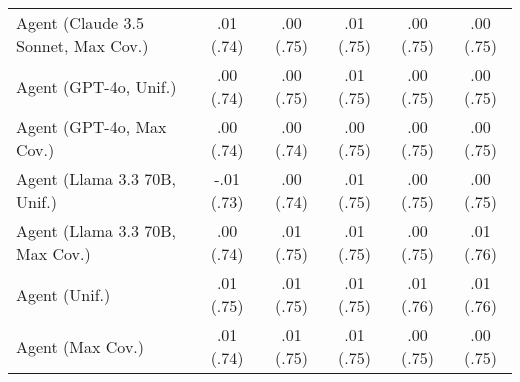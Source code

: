 \begin{table}[h!]
\begin{tabular}{lccccc}
    Agent (Claude 3.5 Sonnet, Max Cov.) & .01 {\small (.74)} & .00 {\small (.75)} & .01 {\small (.75)} & .00 {\small (.75)} & .00 {\small (.75)} \\
    Agent (GPT-4o, Unif.) & .00 {\small (.74)} & .00 {\small (.75)} & .01 {\small (.75)} & .00 {\small (.75)} & .00 {\small (.75)} \\
    Agent (GPT-4o, Max Cov.) & .00 {\small (.74)} & .00 {\small (.74)} & .00 {\small (.75)} & .00 {\small (.75)} & .00 {\small (.75)} \\
    Agent (Llama 3.3 70B, Unif.) & -.01 {\small (.73)} & .00 {\small (.74)} & .01 {\small (.75)} & .00 {\small (.75)} & .00 {\small (.75)} \\
    Agent (Llama 3.3 70B, Max Cov.) & .00 {\small (.74)} & .01 {\small (.75)} & .01 {\small (.75)} & .00 {\small (.75)} & \cellcolor{bronze!30}.01 {\small (.76)} \\
    Agent (Unif.) & \cellcolor{silver!30}.01 {\small (.75)} & \cellcolor{bronze!30}.01 {\small (.75)} & \cellcolor{silver!30}.01 {\small (.75)} & \cellcolor{gold!30}.01 {\small (.76)} & .01 {\small (.76)} \\
    Agent (Max Cov.) & .01 {\small (.74)} & \cellcolor{silver!30}.01 {\small (.75)} & \cellcolor{bronze!30}.01 {\small (.75)} & .00 {\small (.75)} & .00 {\small (.75)} \\
    \bottomrule
    \end{tabular}
\end{table}
